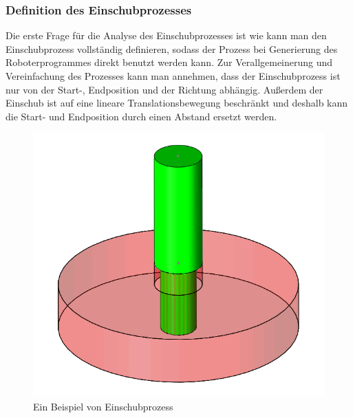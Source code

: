 \documentclass[14pt,a4paper,titlepage]{article}
\begin{document}
		\subsubsection{Definition des Einschubprozesses}
		Die erste Frage für die Analyse des Einschubprozesses ist wie kann man den Einschubprozess vollständig definieren, sodass der Prozess bei Generierung des Roboterprogrammes direkt benutzt werden kann.  Zur Verallgemeinerung und Vereinfachung des Prozesses kann man annehmen, dass der Einschubprozess ist nur von der Start-, Endposition und der Richtung abhängig.  Außerdem der Einschub ist auf eine lineare Translationsbewegung beschränkt und deshalb kann die Start- und Endposition durch einen Abstand ersetzt werden.    
		\begin{figure}[h!]
			\centering
			\includegraphics[width=0.5\linewidth]{Einschub.png}
			\caption{Ein Beispiel von Einschubprozess}
		\end{figure}
\end{document}
